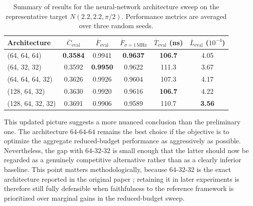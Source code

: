\begin{table}[ht]
\centering
\begin{tabular}{lccccc}
\hline
Architecture & $\overline{C}_{\mathrm{eval}}$ & $\overline{F}_{\mathrm{eval}}$ & $\overline{F}_{\sigma=1\,\mathrm{MHz}}$ & $\overline{T}_{\mathrm{eval}}$ (ns) & $\overline{L}_{\mathrm{eval}}$ ($10^{-4}$) \\
\hline
(64, 64, 64)        & \textbf{0.3584} & 0.9941          & \textbf{0.9637} & \textbf{106.7} & 4.05 \\
(64, 32, 32)        & 0.3592          & \textbf{0.9950} & 0.9622          & 111.3          & 3.67 \\
(64, 64, 64, 32)    & 0.3626          & 0.9926          & 0.9604          & 107.3          & 4.17 \\
(128, 64, 32)       & 0.3630          & 0.9920          & 0.9616          & \textbf{106.7} & 4.22 \\
(128, 64, 32, 32)   & 0.3691          & 0.9906          & 0.9589          & 110.7          & \textbf{3.56} \\
\hline
\end{tabular}
\caption{Summary of results for the neural-network architecture sweep on the representative target $N(2.2,2.2,\pi/2)$. Performance metrics are averaged over three random seeds.}
\label{tab:architecture_sweep_results}
\end{table}

This updated picture suggests a more nuanced conclusion than the preliminary one. The architecture \(64\text{-}64\text{-}64\) remains the best choice if the objective is to optimize the aggregate reduced-budget performance as aggressively as possible. Nevertheless, the gap with \(64\text{-}32\text{-}32\) is small enough that the latter should now be regarded as a genuinely competitive alternative rather than as a clearly inferior baseline. This point matters methodologically, because \(64\text{-}32\text{-}32\) is the exact architecture reported in the original paper \cite{Niu2019}; retaining it in later experiments is therefore still fully defensible when faithfulness to the reference framework is prioritized over marginal gains in the reduced-budget sweep.

